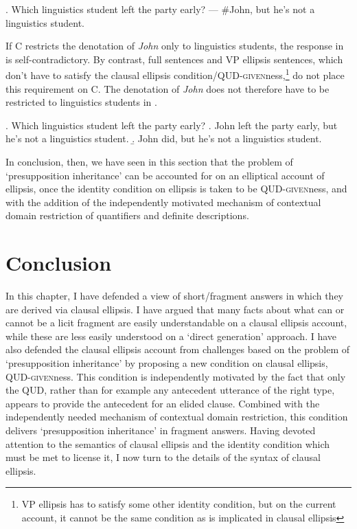 \documentclass[doublespace]{umthesis}
\begin{document}
\ex. 	Which linguistics student left the party early? --- \#John, but he's not a linguistics student.

If C restricts the denotation of {\it John} only to linguistics students, the response in \Last is self-contradictory.
By contrast, full sentences and VP ellipsis sentences, which don't have to satisfy the clausal ellipsis condition/\textsc{QUD-given}ness,\footnote{VP ellipsis has to satisfy some other identity condition, but on the current account, it cannot be the same condition as is implicated in clausal ellipsis}
do not place this requirement on C.
The denotation of {\it John} does not therefore have to be restricted to linguistics students in \Next.

\ex. 	Which linguistics student left the party early?
	\a. John left the party early, but he's not a linguistics student.
	\b. John did, but he's not a linguistics student.
	
In conclusion, then, we have seen in this section that the problem of `presupposition inheritance' can be accounted for on an elliptical account of ellipsis, once the identity condition on ellipsis is taken to be \textsc{QUD-given}ness, and with the addition of the independently motivated mechanism of contextual domain restriction of quantifiers and definite descriptions.

\section{Conclusion}

In this chapter, I have defended a view of short/fragment answers in which they are derived via clausal ellipsis.
I have argued that many facts about what can or cannot be a licit fragment are easily understandable on a clausal ellipsis account, while these are less easily understood on a `direct generation' approach.
I have also defended the clausal ellipsis account from challenges based on the problem of `presupposition inheritance' by proposing a new condition on clausal ellipsis, \textsc{QUD-given}ness.
This condition is independently motivated by the fact that only the QUD, rather than for example any antecedent utterance of the right type, appears to provide the antecedent for an elided clause.
Combined with the independently needed mechanism of contextual domain restriction, this condition delivers `presupposition inheritance' in fragment answers.
Having devoted attention to the semantics of clausal ellipsis and the identity condition which must be met to license it, I now turn to the details of the syntax of clausal ellipsis.



\end{document}
